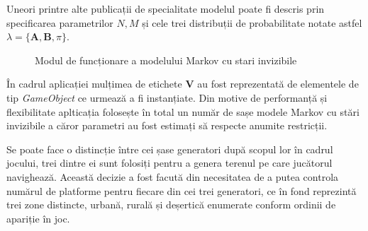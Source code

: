 Uneori printre alte publicații de specialitate modelul poate fi descris prin specificarea parametrilor $N,M$ și cele trei distribuții de probabilitate notate astfel $\lambda = \{\textbf{A},\textbf{B},\pi\}$.\par
\vspace{10mm}
\begin{figure}[H]
\centering
{}
\caption{Modul de funcționare a modelului Markov cu stari invizibile}
\end{figure}
\par

În cadrul aplicației mulțimea de etichete \textbf{V} au fost reprezentată de elementele de tip \textit{GameObject} ce urmează a fi instanțiate. Din motive de performanță și flexibilitate aplticația folosește în total un număr de sașe modele Markov cu stări invizibile a căror parametri au fost estimați să respecte anumite restricții.\par

Se poate face o distincție între cei șase generatori după scopul lor în cadrul jocului, trei dintre ei sunt folosiți pentru a genera terenul pe care jucătorul navighează. Această decizie a fost facută din necesitatea de a putea controla numărul de platforme pentru fiecare din cei trei generatori, ce în fond reprezintă trei zone distincte, urbană, rurală și deșertică enumerate conform ordinii de apariție în joc.\par

